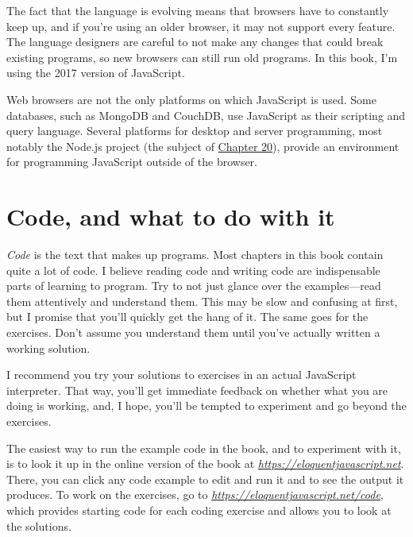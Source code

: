 The fact that the language is evolving means that browsers have to constantly keep up, and if you're using an older browser, it may not support every feature. The language designers are careful to not make any changes that could break existing programs, so new browsers can still run old programs. In this book, I'm using the 2017 version of JavaScript.

Web browsers are not the only platforms on which JavaScript is used. Some databases, such as MongoDB and CouchDB, use JavaScript as their scripting and query language. Several platforms for desktop and server programming, most notably the Node.js project (the subject of \hyperref[node]{Chapter 20}), provide an environment for programming JavaScript outside of the browser.

\section{Code, and what to do with it}

\emph{Code} is the text that makes up programs. Most chapters in this book contain quite a lot of code. I believe reading code and writing code are indispensable parts of learning to program. Try to not just glance over the examples—read them attentively and understand them. This may be slow and confusing at first, but I promise that you'll quickly get the hang of it. The same goes for the exercises. Don't assume you understand them until you've actually written a working solution.

I recommend you try your solutions to exercises in an actual JavaScript interpreter. That way, you'll get immediate feedback on whether what you are doing is working, and, I hope, you'll be tempted to experiment and go beyond the exercises.

The easiest way to run the example code in the book, and to experiment with it, is to look it up in the online version of the book at \href{https://eloquentjavascript.net/}{\emph{https://eloquentjavascript.net}}. There, you can click any code example to edit and run it and to see the output it produces. To work on the exercises, go to \href{https://eloquentjavascript.net/code}{\emph{https://eloquentjavascript.net\slash code}}, which provides starting code for each coding exercise and allows you to look at the solutions.

